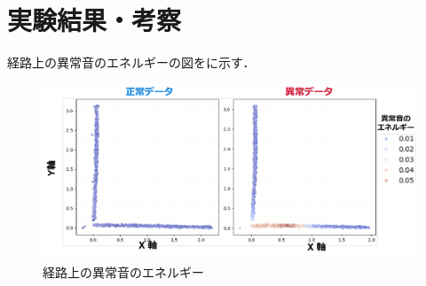 \documentclass[../main]{subfiles}
\begin{document}
\graphicspath{{../figures}}

\section{実験結果・考察}
経路上の異常音のエネルギーの図をに示す．
\begin{figure}[tb]
  \centering
  \includegraphics[keepaspectratio, width=0.8\linewidth]{energy.pdf}
  \caption{経路上の異常音のエネルギー}
\end{figure}
\end{document}
